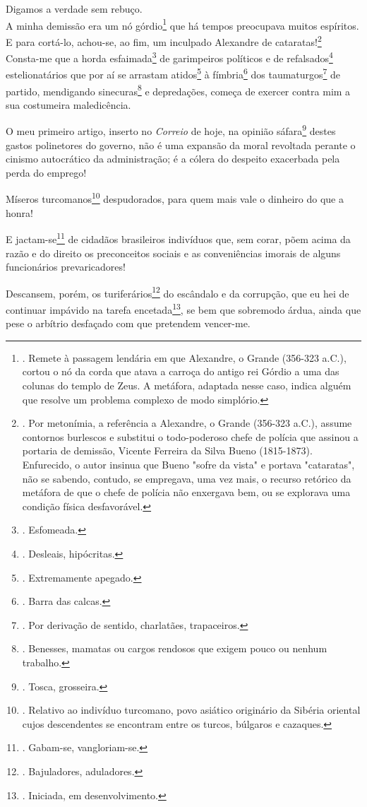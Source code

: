 Digamos a verdade sem rebuço.\\
A minha demissão era um nó górdio\footnote{. Remete à passagem lendária
  em que Alexandre, o Grande (356-323 a.C.), cortou o nó da corda que
  atava a carroça do antigo rei Górdio a uma das colunas do templo de
  Zeus. A metáfora, adaptada nesse caso, indica alguém que resolve um
  problema complexo de modo simplório.} que há tempos preocupava muitos
espíritos. E para cortá-lo, achou-se, ao fim, um inculpado Alexandre de
cataratas!\footnote{. Por metonímia, a referência a Alexandre, o Grande
  (356-323 a.C.), assume contornos burlescos e substitui o todo-poderoso
  chefe de polícia que assinou a portaria de demissão, Vicente Ferreira
  da Silva Bueno (1815-1873). Enfurecido, o autor insinua que Bueno
  "sofre da vista" e portava "cataratas", não se sabendo, contudo, se
  empregava, uma vez mais, o recurso retórico da metáfora de que o chefe
  de polícia não enxergava bem, ou se explorava uma condição física
  desfavorável.}\\
Consta-me que a horda esfaimada\footnote{. Esfomeada.} de garimpeiros
políticos e de refalsados\footnote{. Desleais, hipócritas.}
estelionatários que por aí se arrastam atidos\footnote{. Extremamente
  apegado.} à fímbria\footnote{. Barra das calcas.} dos
taumaturgos\footnote{. Por derivação de sentido, charlatães,
  trapaceiros.} de partido, mendigando sinecuras\footnote{. Benesses,
  mamatas ou cargos rendosos que exigem pouco ou nenhum trabalho.} e
depredações, começa de exercer contra mim a sua costumeira maledicência.

O meu primeiro artigo, inserto no \emph{Correio} de hoje, na opinião
sáfara\footnote{. Tosca, grosseira.} destes gastos polinetores do
governo, não é uma expansão da moral revoltada perante o cinismo
autocrático da administração; é a cólera do despeito exacerbada pela
perda do emprego!

Míseros turcomanos\footnote{. Relativo ao indivíduo turcomano, povo
  asiático originário da Sibéria oriental cujos descendentes se
  encontram entre os turcos, búlgaros e cazaques.} despudorados, para
quem mais vale o dinheiro do que a honra!

E jactam-se\footnote{. Gabam-se, vangloriam-se.} de cidadãos brasileiros
indivíduos que, sem corar, põem acima da razão e do direito os
preconceitos sociais e as conveniências imorais de alguns funcionários
prevaricadores!

Descansem, porém, os turiferários\footnote{. Bajuladores, aduladores.}
do escândalo e da corrupção, que eu hei de continuar impávido na tarefa
encetada\footnote{. Iniciada, em desenvolvimento.}, se bem que sobremodo
árdua, ainda que pese o arbítrio desfaçado com que pretendem vencer-me.

